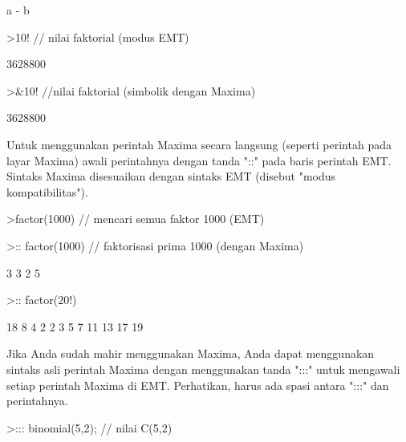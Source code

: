 \begin{eulernotebook}
\begin{euleroutput}
  
                                  a - b
  
    \end{euleroutput}
    \begin{eulerprompt}
>10! // nilai faktorial (modus EMT)
    \end{eulerprompt}
    \begin{euleroutput}
  3628800
    \end{euleroutput}
    \begin{eulerprompt}
>&10! //nilai faktorial (simbolik dengan Maxima)
    \end{eulerprompt}
    \begin{euleroutput}
  
                                 3628800
  
    \end{euleroutput}
    \begin{eulercomment}
        Untuk menggunakan perintah Maxima secara langsung (seperti perintah pada layar
        Maxima) awali perintahnya dengan tanda "::" pada baris perintah EMT. Sintaks
        Maxima disesuaikan dengan sintaks EMT (disebut "modus kompatibilitas").
    \end{eulercomment}
    \begin{eulerprompt}
>factor(1000) // mencari semua faktor 1000 (EMT)
    \end{eulerprompt}
    \begin{euleroutput}
  [2,  2,  2,  5,  5,  5]
    \end{euleroutput}
    \begin{eulerprompt}
>:: factor(1000) // faktorisasi prima 1000 (dengan Maxima) 
    \end{eulerprompt}
    \begin{euleroutput}
  
                                   3  3
                                  2  5
  
    \end{euleroutput}
    \begin{eulerprompt}
>:: factor(20!)
    \end{eulerprompt}
    \begin{euleroutput}
  
                          18  8  4  2
                         2   3  5  7  11 13 17 19
  
    \end{euleroutput}
    \begin{eulercomment}
        Jika Anda sudah mahir menggunakan Maxima, Anda dapat menggunakan sintaks asli
        perintah Maxima dengan menggunakan tanda ":::" untuk mengawali setiap perintah
        Maxima di EMT. Perhatikan, harus ada spasi antara ":::" dan perintahnya.
    \end{eulercomment}
    \begin{eulerprompt}
>::: binomial(5,2); // nilai C(5,2)
    \end{eulerprompt}
    \begin{euleroutput}
  

\end{euleroutput}
\end{eulernotebook}
